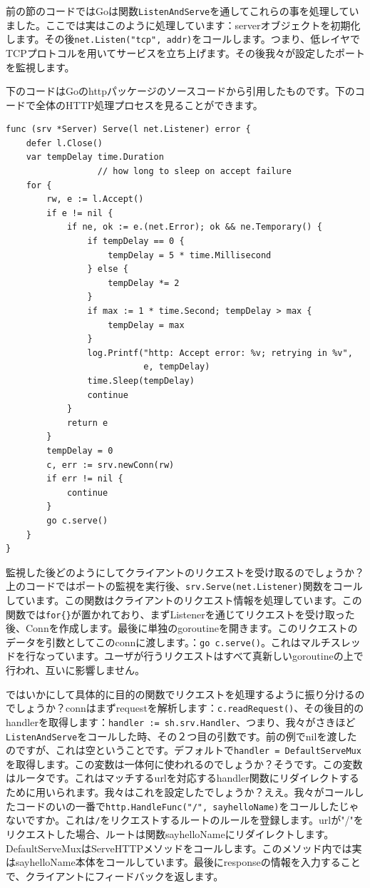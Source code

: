 前の節のコードではGoは関数\texttt{ListenAndServe}を通してこれらの事を処理していました。ここでは実はこのように処理しています：serverオブジェクトを初期化します。その後\texttt{net.Listen("tcp", addr)}をコールします。つまり、低レイヤでTCPプロトコルを用いてサービスを立ち上げます。その後我々が設定したポートを監視します。

下のコードはGoのhttpパッケージのソースコードから引用したものです。下のコードで全体のHTTP処理プロセスを見ることができます。

\begin{lstlisting}[numbers=none]
func (srv *Server) Serve(l net.Listener) error {
    defer l.Close()
    var tempDelay time.Duration
                  // how long to sleep on accept failure
    for {
        rw, e := l.Accept()
        if e != nil {
            if ne, ok := e.(net.Error); ok && ne.Temporary() {
                if tempDelay == 0 {
                    tempDelay = 5 * time.Millisecond
                } else {
                    tempDelay *= 2
                }
                if max := 1 * time.Second; tempDelay > max {
                    tempDelay = max
                }
                log.Printf("http: Accept error: %v; retrying in %v",
                           e, tempDelay)
                time.Sleep(tempDelay)
                continue
            }
            return e
        }
        tempDelay = 0
        c, err := srv.newConn(rw)
        if err != nil {
            continue
        }
        go c.serve()
    }
}
\end{lstlisting}

監視した後どのようにしてクライアントのリクエストを受け取るのでしょうか？上のコードではポートの監視を実行後、\texttt{srv.Serve(net.Listener)}関数をコールしています。この関数はクライアントのリクエスト情報を処理しています。この関数では\texttt{for\{\}}が置かれており、まずListenerを通じてリクエストを受け取った後、Connを作成します。最後に単独のgoroutineを開きます。このリクエストのデータを引数としてこのconnに渡します。：\texttt{go c.serve()}。これはマルチスレッドを行なっています。ユーザが行うリクエストはすべて真新しいgoroutineの上で行われ、互いに影響しません。

ではいかにして具体的に目的の関数でリクエストを処理するように振り分けるのでしょうか？connはまずrequestを解析します：\texttt{c.readRequest()}、その後目的のhandlerを取得します：\texttt{handler := sh.srv.Handler}、つまり、我々がさきほど\texttt{ListenAndServe}をコールした時、その２つ目の引数です。前の例でnilを渡したのですが、これは空ということです。デフォルトで\texttt{handler = DefaultServeMux}を取得します。この変数は一体何に使われるのでしょうか？そうです。この変数はルータです。これはマッチするurlを対応するhandler関数にリダイレクトするために用いられます。我々はこれを設定したでしょうか？ええ。我々がコールしたコードのいの一番で\texttt{http.HandleFunc("/", sayhelloName)}をコールしたじゃないですか。これは\texttt{/}をリクエストするルートのルールを登録します。urlが"/"をリクエストした場合、ルートは関数sayhelloNameにリダイレクトします。DefaultServeMuxはServeHTTPメソッドをコールします。このメソッド内では実はsayhelloName本体をコールしています。最後にresponseの情報を入力することで、クライアントにフィードバックを返します。

